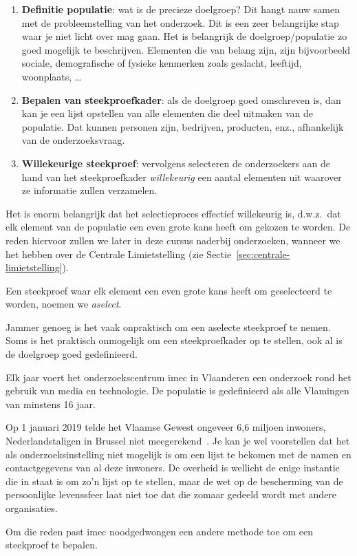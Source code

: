 \begin{enumerate}
  \item \textbf{Definitie populatie}: wat is de precieze doelgroep? Dit hangt nauw samen met de probleemstelling van het onderzoek. Dit is een zeer belangrijke stap waar je niet licht over mag gaan. Het is belangrijk de doelgroep/populatie zo goed mogelijk te beschrijven. Elementen die van belang zijn, zijn bijvoorbeeld sociale, demografische of fysieke kenmerken zoals geslacht, leeftijd, woonplaats, \dots
  \item \textbf{Bepalen van steekproefkader}: als de doelgroep goed omschreven is, dan kan je een lijst opstellen van alle elementen die deel uitmaken van de populatie. Dat kunnen personen zijn, bedrijven, producten, enz., afhankelijk van de onderzoeksvraag.
  \item \textbf{Willekeurige steekproef}: vervolgens selecteren de onderzoekers aan de hand van het steekproefkader \textit{willekeurig} een aantal elementen uit waarover ze informatie zullen verzamelen.
\end{enumerate}

Het is enorm belangrijk dat het selectieproces effectief willekeurig is, d.w.z.~dat elk element van de populatie een even grote kans heeft om gekozen te worden. De reden hiervoor zullen we later in deze cursus naderbij onderzoeken, wanneer we het hebben over de Centrale Limietstelling (zie Sectie~\ref{sec:centrale-limietstelling}).

\begin{definition}
  Een steekproef waar elk element een even grote kans heeft om geselecteerd te worden, noemen we \emph{aselect}.
\end{definition}

Jammer genoeg is het vaak onpraktisch om een aselecte steekproef te nemen. Soms is het praktisch onmogelijk om een steekproefkader op te stellen, ook al is de doelgroep goed gedefinieerd.

\begin{example}
  Elk jaar voert het onderzoekscentrum imec in Vlaanderen een onderzoek rond het gebruik van media en technologie. De populatie is gedefinieerd als alle Vlamingen van minstens 16 jaar.
  
  Op 1 januari 2019 telde het Vlaamse Gewest ongeveer 6,6 miljoen inwoners, Nederlandstaligen in Brussel niet meegerekend~\autocite{Statbel2019}. Je kan je wel voorstellen dat het als onderzoeksinstelling niet mogelijk is om een lijst te bekomen met de namen en contactgegevens van al deze inwoners. De overheid is wellicht de enige instantie die in staat is om zo'n lijst op te stellen, maar de wet op de bescherming van de persoonlijke levenssfeer laat niet toe dat die zomaar gedeeld wordt met andere organisaties.
  
  Om die reden past imec noodgedwongen een andere methode toe om een steekproef te bepalen.
\end{example}

